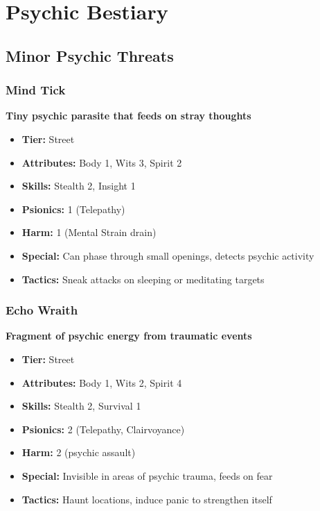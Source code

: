 \documentclass[11pt,twoside]{article}
\begin{document}
\appendix

\section{Psychic Bestiary}

\subsection{Minor Psychic Threats}

\subsubsection{Mind Tick}
\textbf{Tiny psychic parasite that feeds on stray thoughts}
\begin{itemize}[leftmargin=*]
    \item \textbf{Tier:} Street
    \item \textbf{Attributes:} Body 1, Wits 3, Spirit 2
    \item \textbf{Skills:} Stealth 2, Insight 1
    \item \textbf{Psionics:} 1 (Telepathy)
    \item \textbf{Harm:} 1 (Mental Strain drain)
    \item \textbf{Special:} Can phase through small openings, detects psychic activity
    \item \textbf{Tactics:} Sneak attacks on sleeping or meditating targets
\end{itemize}

\subsubsection{Echo Wraith}
\textbf{Fragment of psychic energy from traumatic events}
\begin{itemize}[leftmargin=*]
    \item \textbf{Tier:} Street
    \item \textbf{Attributes:} Body 1, Wits 2, Spirit 4
    \item \textbf{Skills:} Stealth 2, Survival 1
    \item \textbf{Psionics:} 2 (Telepathy, Clairvoyance)
    \item \textbf{Harm:} 2 (psychic assault)
    \item \textbf{Special:} Invisible in areas of psychic trauma, feeds on fear
    \item \textbf{Tactics:} Haunt locations, induce panic to strengthen itself
\end{itemize}
\end{document}
